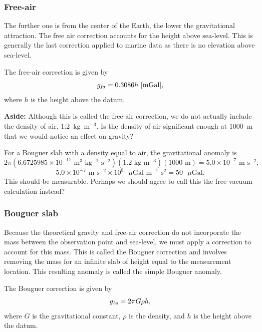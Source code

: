 \subsubsection{Free-air}
The further one is from the center of the Earth, the lower the gravitational attraction.  The free air correction accounts for the height above sea-level.  This is generally the last correction applied to marine data as there is no elevation above sea-level.

The free-air correction is given by
\begin{equation}
    g_{\mathrm{\it fa}} = 0.3086 h \mbox{ $[$mGal$]$},
\end{equation}
where $h$ is the height above the datum.

\begin{framed}
{\bf Aside:} Although this is called the free-air correction, we do not actually include the density of air, 1.2~kg~m$^{-3}$.  Is the density of air significant enough at 1000~m that we would notice an effect on gravity?

For a Bouguer slab with a density equal to air, the gravitational anomaly is
\begin{equation*}
    2 \pi (6.6725985 \times 10^{-11} \mbox{ m$^{3}$ kg$^{-1}$ s$^{-2}$})
    (1.2 \mbox{ kg m$^{-3}$}) (1000 \mbox{ m}) 
    = 5.0 \times 10^{-7} \mbox{ m s$^{-2}$},
\end{equation*}
\begin{equation*}
    5.0 \times 10^{-7} \mbox{ m s$^{-2}$} 
    \times 10^{8} \mbox{ $\mu$Gal m$^{-1}$ s$^{2}$} = 50 \mbox{ $\mu$Gal}.
\end{equation*}
This should be measurable.  Perhaps we should agree to call this the
free-vacuum calculation instead?
\end{framed}

\subsubsection{Bouguer slab}
Because the theoretical gravity and free-air correction do not incorporate the mass between the observation point and sea-level, we must apply a correction to account for this mass.  This is called the Bouguer correction and involves removing the mass for an infinite slab of height equal to the measurement location.  This resulting anomaly is called the simple Bouguer anomaly.

The Bouguer correction is given by
\begin{equation}
    g_{\mathrm{\it bs}} = 2 \pi G \rho h,
\end{equation}
where $G$ is the gravitational constant, $\rho$ is the density, and $h$ is the height above the datum.

